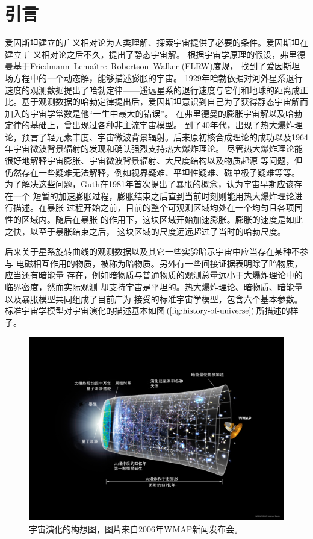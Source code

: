 \chapter{引言}%
\label{chap:introduction}

爱因斯坦建立的广义相对论为人类理解、探索宇宙提供了必要的条件。爱因斯坦在建立
广义相对论之后不久，提出了静态宇宙解。
根据宇宙学原理的假设，弗里德曼基于Friedmann–Lemaître–Robertson–Walker (FLRW)度规，
找到了爱因斯坦场方程中的一个动态解，能够描述膨胀的宇宙。
1929年哈勃依据对河外星系退行速度的观测数据提出了哈勃定律——遥远星系的退行速度与它们和地球的距离成正比。基于观测数据的哈勃定律提出后，爱因斯坦意识到自己为了获得静态宇宙解而加入的宇宙学常数是他“一生中最大的错误”。
在弗里德曼的膨胀宇宙解以及哈勃定律的基础上，曾出现过各种非主流宇宙模型。
到了40年代，出现了热大爆炸理论，预言了轻元素丰度、宇宙微波背景辐射。后来原初核合成理论的成功以及1964年宇宙微波背景辐射的发现和确认强烈支持热大爆炸理论。
尽管热大爆炸理论能很好地解释宇宙膨胀、宇宙微波背景辐射、大尺度结构以及物质起源
等问题，但仍然存在一些疑难无法解释，例如视界疑难、平坦性疑难、磁单极子疑难等等。
为了解决这些问题，Guth在1981年首次提出了暴胀的概念，认为宇宙早期应该存在一个
短暂的加速膨胀过程，膨胀结束之后直到当前时刻则能用热大爆炸理论进行描述。在暴胀
过程开始之前，目前的整个可观测区域均处在一个均匀且各项同性的区域内。随后在暴胀
的作用下，这块区域开始加速膨胀。膨胀的速度是如此之快，以至于暴胀结束之后，
这块区域的尺度远远超过了当时的哈勃尺度。

后来关于星系旋转曲线的观测数据以及其它一些实验暗示宇宙中应当存在某种不参与
电磁相互作用的物质，被称为暗物质。另外有一些间接证据表明除了暗物质，应当还有暗能量
存在，例如暗物质与普通物质的观测总量远小于大爆炸理论中的临界密度，然而实际观测
却支持宇宙是平坦的。热大爆炸理论、暗物质、暗能量以及暴胀模型共同组成了目前广为
接受的标准宇宙学模型，包含六个基本参数。
标准宇宙学模型对宇宙演化的描述基本如图$(\ref{fig:history-of-universe})$所描述的样子。

\begin{figure}[!htbp]
  \centering
  \includegraphics[width=6in]{Img/CMB_Timeline75_zh-cnversion.jpg}
  \caption{宇宙演化的构想图，图片来自2006年WMAP新闻发布会。}\label{fig:history-of-universe}
\end{figure}


